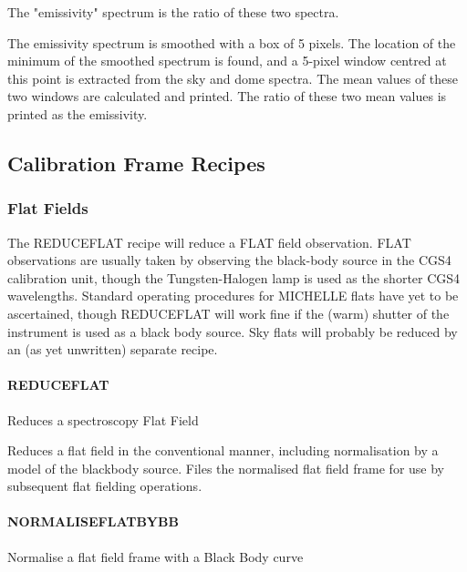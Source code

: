 \documentclass[twoside,11pt]{article}
\renewcommand{\_}{\texttt{\symbol{95}}}
\begin{document}
The "emissivity" spectrum is the ratio of these two spectra.



The emissivity spectrum is smoothed with a box of 5 pixels.  The
location of the minimum of the smoothed spectrum is found, and a
5-pixel window centred at this point is extracted from the sky and
dome spectra.  The mean values of these two windows are calculated and
printed.  The ratio of these two mean values is printed as the
emissivity.


\subsection{Calibration Frame Recipes}

\subsubsection{Flat Fields}

The REDUCE\_FLAT recipe will reduce a FLAT field observation. FLAT
observations are usually taken by observing the black-body source in
the CGS4 calibration unit, though the Tungsten-Halogen lamp is used as
the shorter CGS4 wavelengths. Standard operating procedures for
MICHELLE flats have yet to be ascertained, though REDUCE\_FLAT will
work fine if the (warm) shutter of the instrument is used as a black
body source. Sky flats will probably be reduced by an (as yet
unwritten) separate recipe.

\paragraph{REDUCE\_FLAT\label{REDUCE_FLAT}}

Reduces a spectroscopy Flat Field


\mbox{}

Reduces a flat field in the conventional manner, including
normalisation by a model of the blackbody source. Files the normalised
flat field frame for use by subsequent flat fielding operations.


\paragraph{\_NORMALISE\_FLAT\_BY\_BB\_\label{_NORMALISE_FLAT_BY_BB_}}

Normalise a flat field frame with a Black Body curve
\end{document}
